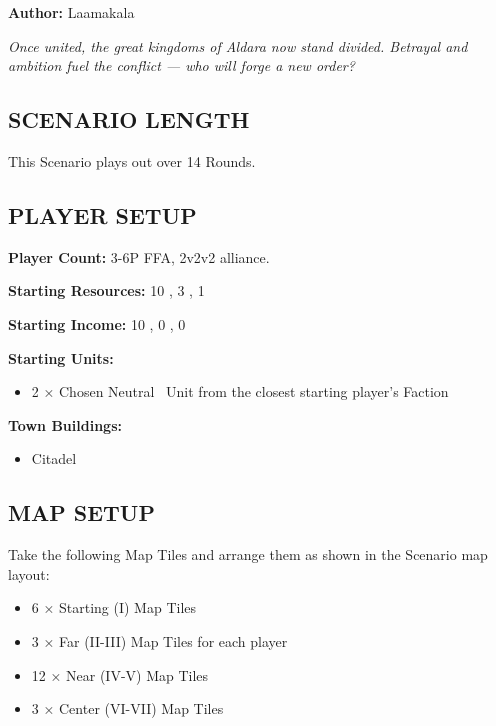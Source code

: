 
\begin{multicols*}{2}

\textbf{Author:} Laamakala

\textit{Once united, the great kingdoms of Aldara now stand divided. Betrayal and ambition fuel the conflict — who will forge a new order?}  %

\subsection*{\MakeUppercase{Scenario Length}}
This Scenario plays out over 14 Rounds.

\subsection*{\MakeUppercase{Player Setup}}
\textbf{Player Count:} 3-6P FFA, 2v2v2 alliance.

\textbf{Starting Resources:} 10 , 3 , 1 

\textbf{Starting Income:} 10 , 0 , 0 

\textbf{Starting Units:}

\begin{itemize}
  \item 2 × Chosen Neutral \bronze\ Unit from the closest starting player's Faction
\end{itemize}

\textbf{Town Buildings:}
\begin{itemize}
  \item Citadel
\end{itemize}

\subsection*{\MakeUppercase{Map Setup}}
Take the following Map Tiles and arrange them as shown in the Scenario map layout:

\begin{itemize}
  \item 6 × Starting (I) Map Tiles
  \item 3 × Far (II-III) Map Tiles for each player
  \item 12 × Near (IV-V) Map Tiles
  \item 3 × Center (VI-VII) Map Tiles
\end{itemize}


\end{multicols*}
